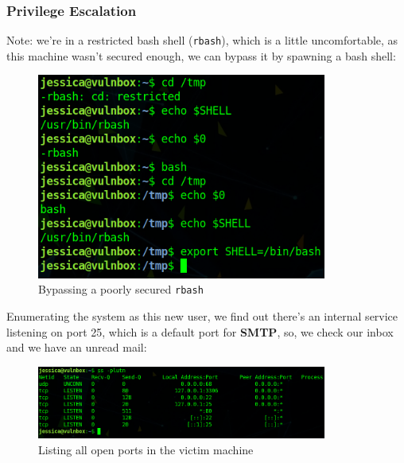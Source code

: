 \documentclass[12pt]{article}
\begin{document}
\pagebreak
\subsubsection{Privilege Escalation}

    Note: we're in a restricted bash shell (\texttt{rbash}), which is a little
    uncomfortable, as this machine wasn't secured enough, we can bypass it by
    spawning a bash shell:

    \begin{figure}[H]\label{pic:61-bypassing-rbash}
        \centering
        \includegraphics[width=0.85\textwidth]{61-bypassing-rbash.png}
        \caption{Bypassing a poorly secured \texttt{rbash}}
    \end{figure}

    Enumerating the system as this new user, we find out there's an internal
    service listening on port 25, which is a default port for \textbf{SMTP}, so,
    we check our inbox and we have an unread mail:

    \begin{figure}[H]\label{pic:62-ss}
        \centering
        \includegraphics[width=0.85\textwidth]{62-ss.png}
        \caption{Listing all open ports in the victim machine}
    \end{figure}
\end{document}
